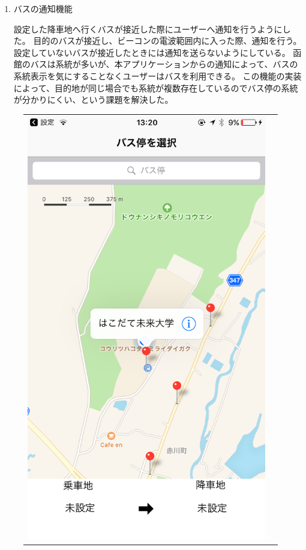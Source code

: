 \documentclass[openany,11pt,papersize]{jsbook}
\begin{document}
\begin{enumerate}
\item バスの通知機能\mbox{}

設定した降車地へ行くバスが接近した際にユーザーへ通知を行うようにした。
目的のバスが接近し、ビーコンの電波範囲内に入った際、通知を行う。
設定していないバスが接近したときには通知を送らないようにしている。
函館のバスは系統が多いが、本アプリケーションからの通知によって、バスの系統表示を気にすることなくユーザーはバスを利用できる。
この機能の実装によって、目的地が同じ場合でも系統が複数存在しているのでバス停の系統が分かりにくい、という課題を解決した。

\end{enumerate}



  \begin{figure}[H]
    \begin{tabular}{cc}
      \begin{minipage}[t]{0.45\hsize}
        \centering
        \includegraphics[keepaspectratio, scale=0.2]{img/select.png}

\end{minipage}
\end{tabular}
\end{figure}
\end{document}

